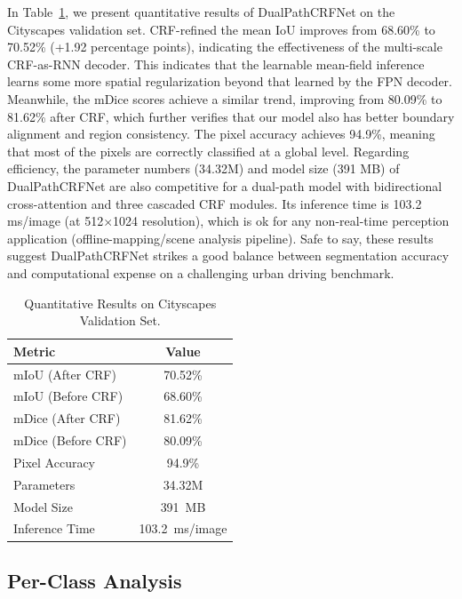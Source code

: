 \documentclass[conference]{IEEEtran}
\begin{document}
In Table~\ref{tab:results}, we present quantitative results of DualPathCRFNet on the
Cityscapes validation set. CRF-refined the mean IoU improves from 68.60\% to 70.52\% (+1.92 percentage points), indicating the
effectiveness of the multi-scale CRF-as-RNN decoder. This indicates that the learnable mean-field
inference learns some more spatial regularization beyond that learned by the FPN decoder. Meanwhile,
the mDice scores achieve a similar trend, improving from 80.09\% to 81.62\% after CRF, which further
verifies that our model also has better boundary alignment and region consistency. The pixel accuracy
achieves 94.9\%, meaning that most of the pixels are correctly classified at a global level. Regarding
efficiency, the parameter numbers (34.32M) and model size (391 MB) of DualPathCRFNet are also
competitive for a dual-path model with bidirectional cross-attention and three cascaded CRF modules. Its
inference time is 103.2 ms/image (at 512$\times$1024 resolution), which is ok for any non-real-time perception
application (offline-mapping/scene analysis pipeline). Safe to say, these results suggest DualPathCRFNet
strikes a good balance between segmentation accuracy and computational expense on a challenging urban
driving benchmark.

\begin{table}[!b]
  \centering
  \caption{Quantitative Results on Cityscapes Validation Set.}
  \label{tab:results}
  \footnotesize
  \begin{tabular}{@{}lc@{}}
    \toprule
    \textbf{Metric} & \textbf{Value} \\
    \midrule
    mIoU (After CRF)     & 70.52\% \\
    mIoU (Before CRF)    & 68.60\% \\
    mDice (After CRF)    & 81.62\% \\
    mDice (Before CRF)   & 80.09\% \\
    Pixel Accuracy       & 94.9\%  \\
    Parameters           & 34.32M  \\
    Model Size           & 391~MB  \\
    Inference Time       & 103.2~ms/image \\
    \bottomrule
  \end{tabular}
\end{table}

\subsection{Per-Class Analysis}\label{subsec:perclass}
\end{document}
